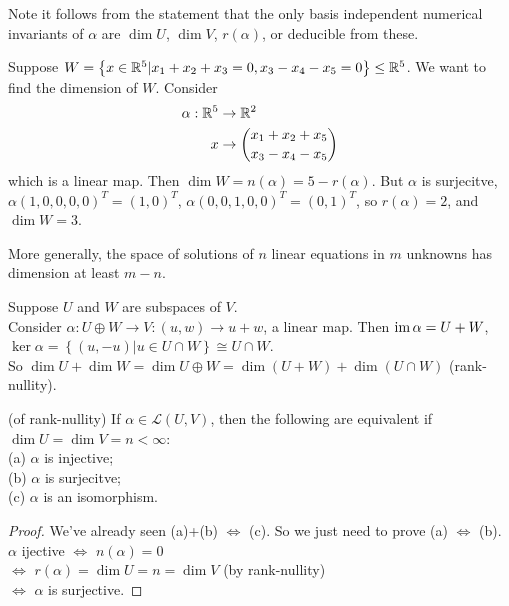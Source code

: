 \documentclass[a4paper]{article}
\begin{document}
Note it follows from the statement that the only basis independent numerical invariants of $\alpha$ are $\dim U$, $\dim V$, $r\left(\alpha\right)$, or deducible from these.

\begin{eg}
Suppose $W = \left\{ x\in \mathbb{R}^5 | x_1+x_2+x_3 = 0, x_3-x_4-x_5 = 0\right\} \leq \mathbb{R}^5$. We want to find the dimension of $W$. Consider
\begin{equation*}
\begin{aligned}
\alpha: \mathbb{R}^5 &\to \mathbb{R}^2\\
x &\to {x_1+x_2+x_5 \choose x_3-x_4-x_5}
\end{aligned}
\end{equation*}
which is a linear map. Then $\dim W = n\left(\alpha\right) = 5-r\left(\alpha\right)$.
But $\alpha$ is surjecitve, $\alpha \left(1,0,0,0,0\right)^T = \left(1,0\right)^T$, $\alpha\left(0,0,1,0,0\right)^T = \left(0,1\right)^T$, so $r\left(\alpha\right)=2$, and $\dim W = 3$.

More generally, the space of solutions of $n$ linear equations in $m$ unknowns has dimension at least $m-n$.
\end{eg}

\begin{eg}
Suppose $U$ and $W$ are subspaces of $V$.\\
Consider $\alpha: U \oplus W \to V: \left(u,w\right) \to u+w$, a linear map. Then $\operatorname{im}\alpha = U+W$, $\ker\alpha = \left\{\left(u,-u\right)|u \in U\cap W\right\} \cong U\cap W$.\\
So $\dim U + \dim W = \dim U \oplus W = \dim\left(U + W\right) + \dim\left(U\cap W\right)$ (rank-nullity).
\end{eg}

\begin{coro} (of rank-nullity) If $\alpha\in \mathcal{L}\left(U,V\right)$, then the following are equivalent if $\dim U = \dim V = n < \infty$:\\
(a) $\alpha$ is injective;\\
(b) $\alpha$ is surjecitve;\\
(c) $\alpha$ is an isomorphism.
\begin{proof}
We've already seen (a)+(b) $\iff$ (c). So we just need to prove (a) $\iff$ (b).\\
$\alpha$ ijective $\iff$ $n\left(\alpha\right) = 0$\\
$\iff$ $r\left(\alpha\right) = \dim U = n = \dim V$ (by rank-nullity)\\
$\iff$ $\alpha$ is surjective.
\end{proof}
\end{coro}
\end{document}
